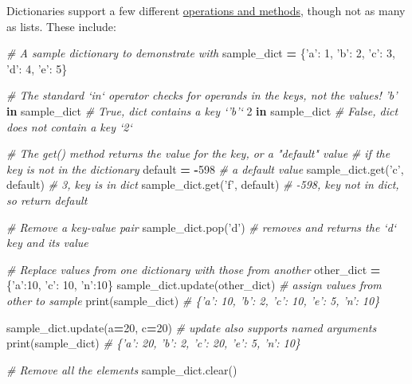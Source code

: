 \documentclass[]{book}
\newenvironment{Shaded}{\begin{snugshade}}{\end{snugshade}}
\newcommand{\KeywordTok}[1]{\textcolor[rgb]{0.13,0.29,0.53}{\textbf{#1}}}
\newcommand{\DecValTok}[1]{\textcolor[rgb]{0.00,0.00,0.81}{#1}}
\newcommand{\StringTok}[1]{\textcolor[rgb]{0.31,0.60,0.02}{#1}}
\newcommand{\CommentTok}[1]{\textcolor[rgb]{0.56,0.35,0.01}{\textit{#1}}}
\newcommand{\OperatorTok}[1]{\textcolor[rgb]{0.81,0.36,0.00}{\textbf{#1}}}
\newcommand{\BuiltInTok}[1]{#1}
\newcommand{\NormalTok}[1]{#1}
\begin{document}
Dictionaries support a few different
\href{https://docs.python.org/3/library/stdtypes.html\#mapping-types-dict}{operations
and methods}, though not as many as lists. These include:

\begin{Shaded}
\begin{Highlighting}[]
\CommentTok{# A sample dictionary to demonstrate with}
\NormalTok{sample_dict }\OperatorTok{=}\NormalTok{ \{}\StringTok{'a'}\NormalTok{: }\DecValTok{1}\NormalTok{, }\StringTok{'b'}\NormalTok{: }\DecValTok{2}\NormalTok{, }\StringTok{'c'}\NormalTok{: }\DecValTok{3}\NormalTok{, }\StringTok{'d'}\NormalTok{: }\DecValTok{4}\NormalTok{, }\StringTok{'e'}\NormalTok{: }\DecValTok{5}\NormalTok{\}}

\CommentTok{# The standard `in` operator checks for operands in the keys, not the values!}
\CommentTok{'b'} \KeywordTok{in}\NormalTok{ sample_dict  }\CommentTok{# True, dict contains a key `'b'`}
\DecValTok{2} \KeywordTok{in}\NormalTok{ sample_dict  }\CommentTok{# False, dict does not contain a key `2`}

\CommentTok{# The get() method returns the value for the key, or a "default" value}
\CommentTok{# if the key is not in the dictionary}
\NormalTok{default }\OperatorTok{=} \OperatorTok{-}\DecValTok{598}  \CommentTok{# a default value}
\NormalTok{sample_dict.get(}\StringTok{'c'}\NormalTok{, default)  }\CommentTok{# 3, key is in dict}
\NormalTok{sample_dict.get(}\StringTok{'f'}\NormalTok{, default)  }\CommentTok{# -598, key not in dict, so return default}

\CommentTok{# Remove a key-value pair}
\NormalTok{sample_dict.pop(}\StringTok{'d'}\NormalTok{)  }\CommentTok{# removes and returns the `d` key and its value}

\CommentTok{# Replace values from one dictionary with those from another}
\NormalTok{other_dict }\OperatorTok{=}\NormalTok{ \{}\StringTok{'a'}\NormalTok{:}\DecValTok{10}\NormalTok{, }\StringTok{'c'}\NormalTok{: }\DecValTok{10}\NormalTok{, }\StringTok{'n'}\NormalTok{:}\DecValTok{10}\NormalTok{\}}
\NormalTok{sample_dict.update(other_dict)  }\CommentTok{# assign values from other to sample}
\BuiltInTok{print}\NormalTok{(sample_dict)  }\CommentTok{# \{'a': 10, 'b': 2, 'c': 10, 'e': 5, 'n': 10\}}

\NormalTok{sample_dict.update(a}\OperatorTok{=}\DecValTok{20}\NormalTok{, c}\OperatorTok{=}\DecValTok{20}\NormalTok{)  }\CommentTok{# update also supports named arguments}
\BuiltInTok{print}\NormalTok{(sample_dict)  }\CommentTok{# \{'a': 20, 'b': 2, 'c': 20, 'e': 5, 'n': 10\}}

\CommentTok{# Remove all the elements}
\NormalTok{sample_dict.clear()}
\end{Highlighting}
\end{Shaded}
\end{document}
